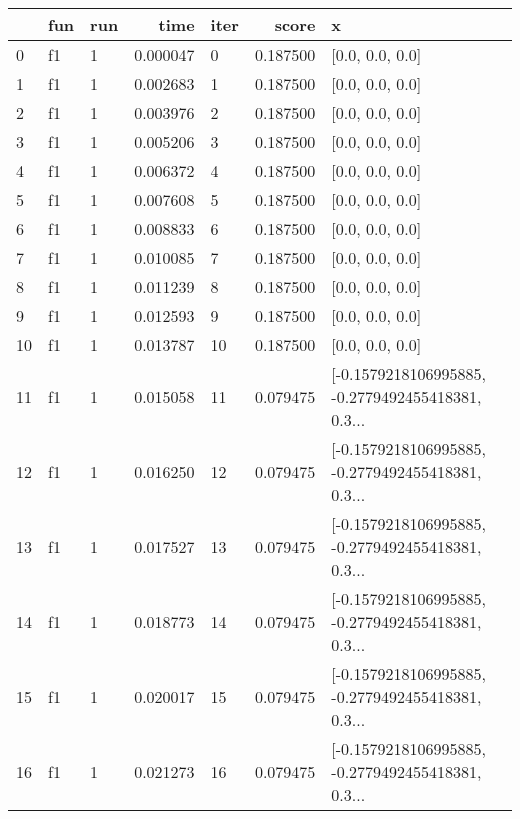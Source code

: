 \begin{tabular}{lllrlrl}
\toprule
{} & fun & run &      time & iter &     score &                                                  x \\
\midrule
0   &  f1 &   1 &  0.000047 &    0 &  0.187500 &                                    [0.0, 0.0, 0.0] \\
1   &  f1 &   1 &  0.002683 &    1 &  0.187500 &                                    [0.0, 0.0, 0.0] \\
2   &  f1 &   1 &  0.003976 &    2 &  0.187500 &                                    [0.0, 0.0, 0.0] \\
3   &  f1 &   1 &  0.005206 &    3 &  0.187500 &                                    [0.0, 0.0, 0.0] \\
4   &  f1 &   1 &  0.006372 &    4 &  0.187500 &                                    [0.0, 0.0, 0.0] \\
5   &  f1 &   1 &  0.007608 &    5 &  0.187500 &                                    [0.0, 0.0, 0.0] \\
6   &  f1 &   1 &  0.008833 &    6 &  0.187500 &                                    [0.0, 0.0, 0.0] \\
7   &  f1 &   1 &  0.010085 &    7 &  0.187500 &                                    [0.0, 0.0, 0.0] \\
8   &  f1 &   1 &  0.011239 &    8 &  0.187500 &                                    [0.0, 0.0, 0.0] \\
9   &  f1 &   1 &  0.012593 &    9 &  0.187500 &                                    [0.0, 0.0, 0.0] \\
10  &  f1 &   1 &  0.013787 &   10 &  0.187500 &                                    [0.0, 0.0, 0.0] \\
11  &  f1 &   1 &  0.015058 &   11 &  0.079475 &  [-0.1579218106995885, -0.2779492455418381, 0.3... \\
12  &  f1 &   1 &  0.016250 &   12 &  0.079475 &  [-0.1579218106995885, -0.2779492455418381, 0.3... \\
13  &  f1 &   1 &  0.017527 &   13 &  0.079475 &  [-0.1579218106995885, -0.2779492455418381, 0.3... \\
14  &  f1 &   1 &  0.018773 &   14 &  0.079475 &  [-0.1579218106995885, -0.2779492455418381, 0.3... \\
15  &  f1 &   1 &  0.020017 &   15 &  0.079475 &  [-0.1579218106995885, -0.2779492455418381, 0.3... \\
16  &  f1 &   1 &  0.021273 &   16 &  0.079475 &  [-0.1579218106995885, -0.2779492455418381, 0.3... \\

\end{tabular}
